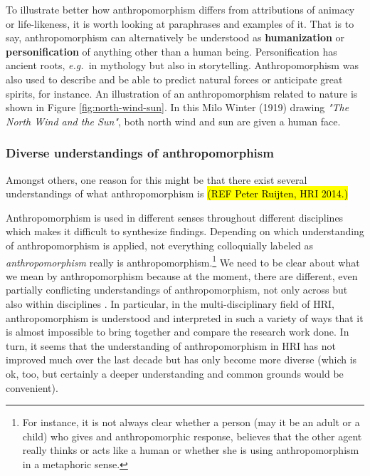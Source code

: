 \documentclass{frontiersSCNS} %
\newcommand{\eg}{{\textit{e.g.~}}}
\begin{document}
To illustrate better how anthropomorphism differs from attributions of animacy or life-likeness, it is worth looking at paraphrases and examples of it. That is to say, anthropomorphism can alternatively be understood as \textbf{humanization} or \textbf{personification} of anything other than a human being. Personification has ancient roots, \eg in mythology but also in storytelling. Anthropomorphism was also used to describe and be able to predict natural forces or anticipate great spirits, for instance. An illustration of an anthropomorphism related to nature is shown in Figure \ref{fig:north-wind-sun}. In this Milo Winter (1919) drawing \textit{"The North Wind and the Sun"}, both north wind and sun are given a human face.


\subsubsection{Diverse understandings of anthropomorphism\\}

Amongst others, one reason for this might be that there exist several understandings of what anthropomorphism is \hl{(REF Peter Ruijten, HRI 2014.)}

Anthropomorphism is used in different senses throughout different disciplines \citep{duffy_anthropomorphism_2003} which makes it difficult to synthesize findings. Depending on which understanding of anthropomorphism is applied, not everything colloquially labeled as \emph{anthropomorphism} really is anthropomorphism.\footnote{For instance, it is not always clear whether a person (may it be an adult or a child) who gives and anthropomorphic response, believes that the other agent really thinks or acts like a human or whether she is using anthropomorphism in a metaphoric sense.\citep{leeds_childrens_1992}} We need to be clear about what we mean by anthropomorphism because at the moment, there are different, even partially conflicting understandings of anthropomorphism, not only across but also within disciplines \cite{duffy_anthropomorphism_2002}. In particular, in the multi-disciplinary field of HRI, anthropomorphism is understood and interpreted in such a variety of ways that it is almost impossible to bring together and compare the research work done. In turn, it seems that the understanding of anthropomorphism in HRI has not improved much over the last decade but has only become more diverse (which is ok, too, but certainly a deeper understanding and common grounds would be convenient). 
\end{document}

